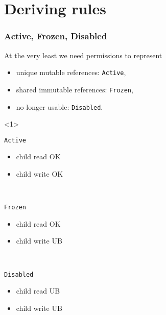 \section{Deriving rules}


\begin{frame}[t]
    \frametitle{Active, Frozen, Disabled}
    At the very least we need permissions to represent
    \begin{itemize}
        \item unique mutable references: \texttt{Active},
        \item shared immutable references: \texttt{Frozen},
        \item no longer usable: \texttt{Disabled}.
    \end{itemize}

    \begin{onlyenv}<1>
        \begin{minipage}{0.3\textwidth}
            \begin{block}{\texttt{Active}}
                \begin{itemize}
                    \item child read OK
                    \item child write OK
                \end{itemize}
            \end{block}
        \end{minipage}
        ~
        \begin{minipage}{0.3\textwidth}
            \begin{block}{\texttt{Frozen}}
                \begin{itemize}
                    \item child read OK
                    \item child write UB
                \end{itemize}
            \end{block}
        \end{minipage}
        ~
        \begin{minipage}{0.3\textwidth}
            \begin{block}{\texttt{Disabled}}
                \begin{itemize}
                    \item child read UB
                    \item child write UB
                \end{itemize}
            \end{block}
        \end{minipage}
    \end{onlyenv}


\end{frame}
